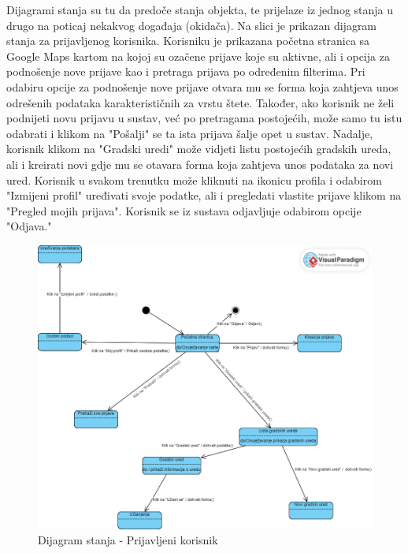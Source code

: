 			
			Dijagrami stanja su tu da predoče stanja objekta, te prijelaze iz jednog stanja u drugo na poticaj nekakvog događaja (okidača). Na slici je prikazan dijagram stanja za prijavljenog korisnika. Korisniku je prikazana početna stranica sa Google Maps kartom na kojoj su ozačene prijave koje su aktivne, ali i opcija za podnošenje nove prijave kao i pretraga prijava po određenim filterima. Pri odabiru opcije za podnošenje nove prijave otvara mu se forma koja zahtjeva unos odrešenih podataka karakterističnih za vrstu  štete. Također, ako korisnik ne želi podnijeti novu prijavu u sustav, već po pretragama postojećih, može samo tu istu odabrati i klikom na "Pošalji" se ta ista prijava šalje opet u sustav. Nadalje, korisnik klikom na "Gradski uredi" može vidjeti listu postojećih gradskih ureda, ali i kreirati novi gdje mu se otavara forma koja zahtjeva unos podataka za novi ured. Korisnik u svakom trenutku može kliknuti na ikonicu profila i odabirom "Izmijeni profil" uređivati svoje podatke, ali i pregledati vlastite prijave klikom na "Pregled mojih prijava". Korisnik se iz sustava odjavljuje odabirom opcije "Odjava."
			
			
			\begin{figure}[H]
			\includegraphics[scale=0.4]{slike/DijagramStanja.PNG} %
			\centering
			\caption{Dijagram stanja - Prijavljeni korisnik}
			\label{fig:bazapod}
		\end{figure}
			
			\eject 
		
